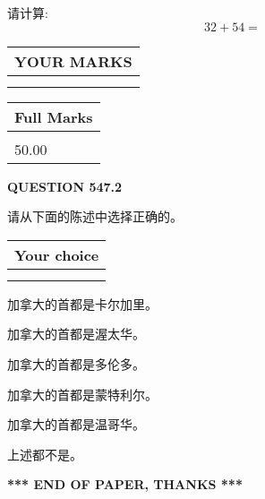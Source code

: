 \documentclass{ctexart}
\begin{document}
  
 
请计算:
\begin{equation}
32 +  %
54 = \nonumber
\end{equation}
 

 

 
  
\vspace{0.2in}
  
\noindent\begin{tabular}{|l|}
\hline
 YOUR MARKS  \\
\hline
 \\ 
 \\ 
\hline
\end{tabular}
\hspace{0.05in} \begin{tabular}{|l|}
\hline
 Full Marks  \\
\hline
 \\ 
50.00 \\
\hline
\end{tabular}
{\textbf{\Large{QUESTION
547.2 
}}}
  
  
请从下面的陈述中选择正确的。
  
  
\noindent\hspace{3.0in} \begin{tabular}{|l|}
\hline
Your choice \\
\hline
 \\ 
 \\ 
\hline
\end{tabular}
  
  
 
 
加拿大的首都是卡尔加里。
 
 
加拿大的首都是渥太华。
 
 
加拿大的首都是多伦多。
 
 
加拿大的首都是蒙特利尔。
 
 
加拿大的首都是温哥华。
 
 
 上述都不是。
 
 
   
   
 \vspace{0.2in}
 
   
   
   
   
\vspace{1.0in} 
{\textbf{\large{ *** END OF PAPER, THANKS *** }}} 
   
\end{document}
